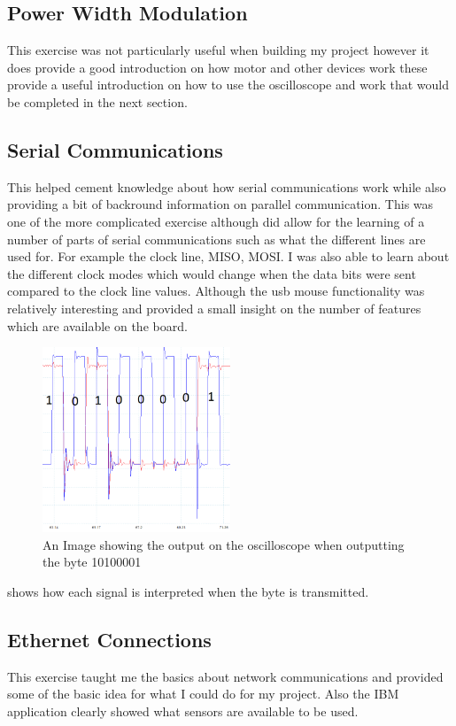 \documentclass[a4paper,12pt]{scrartcl}
\begin{document}
{		\subsection{Power Width Modulation}
		{
			This exercise was not particularly useful when building my project however it does provide a good introduction on how motor and other devices work these provide a useful introduction on how to use the oscilloscope and work that would be completed in the next section.
		}
		\subsection{Serial Communications}
		{
			This helped cement knowledge about how serial communications work while also providing a bit of backround information on parallel communication. This was one of the more complicated exercise although did allow for the learning of a number of parts of serial communications such as what the different lines are used for. For example the clock line, MISO, MOSI. I was also able to learn about the different clock modes which would change when the data bits were sent compared to the clock line values. Although the usb mouse functionality was relatively interesting and provided a small insight on the number of features which are available on the board.
			\begin{figure}[h]
				\centering
				\includegraphics[width=0.5\textwidth]{Task1-Edited}
				\caption{An Image showing the output on the oscilloscope when outputting the byte 10100001}
				\label{img:AnotatedByteOutput}
			\end{figure}
			 shows how each signal is interpreted when the byte is transmitted.
		}
		\subsection{Ethernet Connections}
		{
			This exercise taught me the basics about network communications and provided some of the basic idea for what I could do for my project. Also the IBM application clearly showed what sensors are available to be used.
		}
	}
\end{document}
